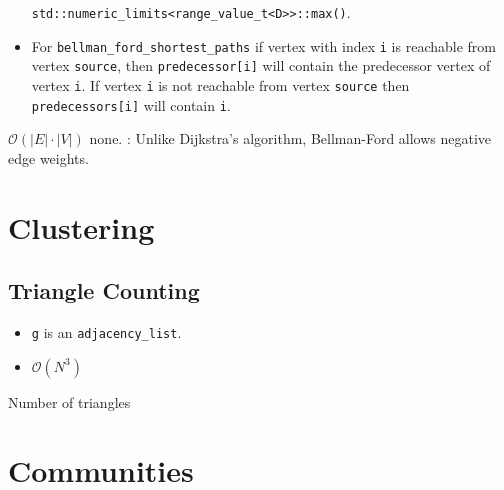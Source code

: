 \begin{itemdescr}
\begin{itemize}
                  \lstinline{std::numeric_limits<range_value_t<D>>::max()}.
            \item
                  For \lstinline{bellman_ford_shortest_paths} if vertex with index \lstinline{i} is reachable
                  from vertex \lstinline{source}, then \lstinline{predecessor[i]} will contain the
                  predecessor vertex of vertex \lstinline{i}.  If vertex \lstinline{i} is not reachable
                  from vertex \lstinline{source} then \lstinline{predecessors[i]} will contain
                  \lstinline{i}.
      \end{itemize}
      \pnum\complexity $\mathcal{O}(|E| \cdot |V|)$ 
      \pnum\throws none. 
      \pnum\remarks:  Unlike Dijkstra's algorithm, Bellman-Ford allows negative edge weights.
\end{itemdescr}


\section{Clustering}
\subsection{Triangle Counting}

{\small
      
}
\begin{itemdescr}
      \pnum\preconditions
      \begin{itemize}
            \item
              \lstinline{g} is an \lstinline{adjacency_list}.
            \item
              \pnum\complexity $\mathcal{O}(N^3)$
      \end{itemize}
      \pnum\returns Number of triangles
\end{itemdescr}

\section{Communities}
